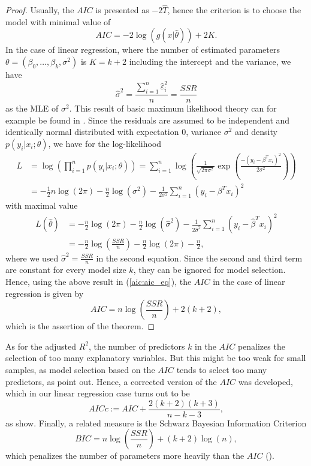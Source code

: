 \documentclass[a4paper, 11pt]{scrreprt}
\begin{document}
\begin{proof}
Usually, the $AIC$ is presented as $-2\hat{T}$, hence the criterion is to choose the model with minimal value of
\begin{equation}\label{aic:aic_eq}
AIC = -2 \log(g(x|\hat{\theta})) + 2K.
\end{equation}
In the case of linear regression, where the number of estimated parameters \linebreak $\theta = (\beta_0,\ldots, \beta_k, \sigma^2)$ is $K = k + 2$ including the intercept and the variance, we have
\[ 
\hat{\sigma}^2 = \frac{\sum_{i=1}^n \hat{\varepsilon}_i^2}{n} = \frac{SSR}{n}
\] 
as the MLE of $\sigma^2$. This result of basic maximum likelihood theory can for example be found in \textcite[chapter 2.2, p. 63]{burnham2003model}.
Since the residuals are assumed to be independent and identically normal distributed with expectation 0, variance $\sigma^2$ and density $p(y_i | x_i; \theta)$, we have for the log-likelihood
\begin{align*}
L &= \log \left( \prod_{i=1}^n p(y_i | x_i; \theta) \right)
  = \sum_{i=1}^n \log \left( \frac{1}{\sqrt{2\pi\sigma^2}} \exp \left(\frac{-(y_i - \beta^T x_i)^2}{2\sigma^2} \right)    \right) \\
  &= -\frac{1}{2} n \log(2\pi) - \frac{n}{2} \log(\sigma^2) - \frac{1}{2\sigma^2} \sum_{i=1}^n (y_i - \beta^T x_i)^2
\end{align*}
with maximal value
\begin{align*}
L(\hat{\theta}) &= -\frac{n}{2}\log(2\pi) - \frac{n}{2} \log(\hat{\sigma}^2) - \frac{1}{2 \hat{\sigma}^2} \sum_{i=1}^n (y_i - \hat{\beta}^T x_i)^2 \\
&= -\frac{n}{2} \log \left(\frac{SSR}{n} \right) - \frac{n}{2}\log(2\pi) - \frac{n}{2},
\end{align*}
where we used $\hat{\sigma}^2 = \frac{SSR}{n}$ in the second equation.
Since the second and third term are constant for every model size $k$, they can be ignored for model selection. Hence, using the above result in (\ref{aic:aic_eq}), the $AIC$ in the case of linear regression is given by
\[ 
AIC = n \log \left( \frac{SSR}{n} \right) + 2(k+2),
\]
which is the assertion of the theorem.
\end{proof}



As for the adjusted $R^2$, the number of predictors $k$ in the $AIC$ penalizes the selection of too many explanatory variables. But this might be too weak for small samples, as model selection based on the $AIC$ tends to select too many predictors, as \textcite[chapter 7.7.3]{burnham2003model} point out.
Hence, a corrected version of the $AIC$ was developed, which in our linear regression case turns out to be
\[ 
AICc := AIC + \frac{2(k+2)(k+3)}{n-k-3}, 
\]
as \textcite[chapter 7.7]{burnham2003model} show.
Finally, a related measure is the Schwarz Bayesian Information Criterion
\begin{equation*}
BIC = n\log\left(\frac{SSR}{n}\right) + (k+2)\log(n),
\end{equation*}
which penalizes the number of parameters more heavily than the $AIC$ (\textcite[chapter 5.3]{hyndman2014forecasting}).
\end{document}
